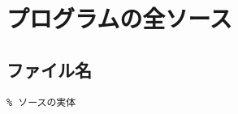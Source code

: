 \appendix         %
\chapter{プログラムの全ソース}

\section{ファイル名}

\small
\begin{verbatim}
% ソースの実体
\end{verbatim}
